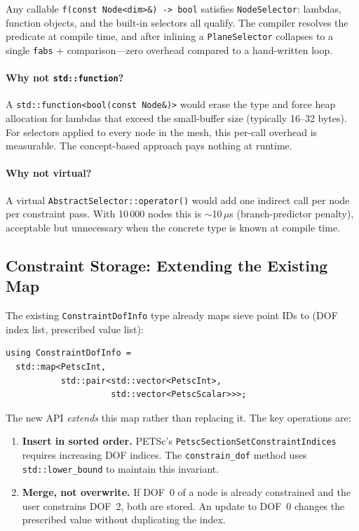 \noindent
Any callable \lstinline{f(const Node<dim>&) -> bool} satisfies
\texttt{NodeSelector}: lambdas, function objects, and the built-in
selectors all qualify.  The compiler resolves the predicate at compile
time, and after inlining a \texttt{PlaneSelector} collapses to a single
\texttt{fabs} + comparison---zero overhead compared to a hand-written
loop.

\paragraph{Why not \texttt{std::function}?}
A \texttt{std::function<bool(const Node\&)>} would erase the type and
force heap allocation for lambdas that exceed the small-buffer size (typically
16--32 bytes).  For selectors applied to every node in the mesh, this
per-call overhead is measurable.  The concept-based approach pays nothing
at runtime.

\paragraph{Why not virtual?}
A virtual \texttt{AbstractSelector::operator()} would add one indirect
call per node per constraint pass.  With 10\,000 nodes this is
$\sim$10\,$\mu$s (branch-predictor penalty), acceptable but unnecessary
when the concrete type is known at compile time.


\subsection{Constraint Storage: Extending the Existing Map}

The existing \texttt{ConstraintDofInfo} type already maps sieve point IDs
to (DOF index list, prescribed value list):

\begin{lstlisting}
using ConstraintDofInfo =
  std::map<PetscInt,
           std::pair<std::vector<PetscInt>,
                     std::vector<PetscScalar>>>;
\end{lstlisting}

\noindent
The new API \emph{extends} this map rather than replacing it.  The key
operations are:

\begin{enumerate}[nosep]
  \item \textbf{Insert in sorted order.}  PETSc's
        \texttt{PetscSectionSetConstraintIndices} requires increasing
        DOF indices.  The \texttt{constrain\_dof} method uses
        \texttt{std::lower\_bound} to maintain this invariant.
  \item \textbf{Merge, not overwrite.}  If DOF~0 of a node is already
        constrained and the user constrains DOF~2, both are stored.
        An update to DOF~0 changes the prescribed value without
        duplicating the index.
\end{enumerate}

